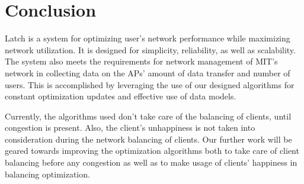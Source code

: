 \documentclass[journal]{IEEEtran}
\begin{document}
\section{Conclusion}

Latch is a system for optimizing user's network performance while maximizing network utilization. It is designed for simplicity, reliability, as well as scalability. The system also meets the requirements for network management of MIT's network in collecting data on the APs' amount of data transfer and number of users. This is accomplished by leveraging the use of our designed algorithms for constant optimization updates and effective use of data models.

Currently, the algorithms used don't take care of the balancing of clients, until congestion is present. Also, the client's unhappiness is not taken into consideration during the network balancing of clients. Our further work will be geared towards improving the optimization algorithms both to take care of client balancing before any congestion as well as to make usage of clients' happiness in balancing optimization.





%

\end{document}
